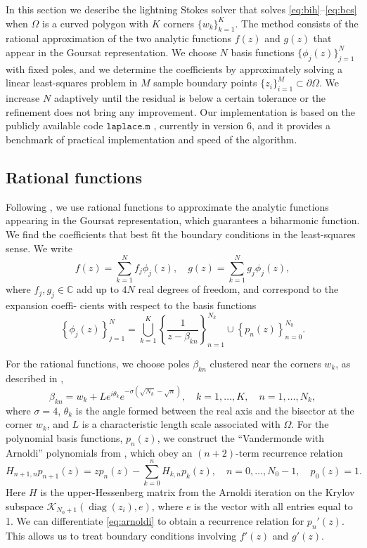 \documentclass{article}
\DeclareMathOperator{\diag}{diag}
\begin{document}
In this section we describe the lightning Stokes solver that solves
\eqref{eq:bih}--\eqref{eq:bcs} when $\Omega$ is a curved polygon with $K$
corners $\{w_k\}_{k=1}^K$. The method consists of the rational approximation of
the two analytic functions $f(z)$ and $g(z)$ that appear in the Goursat
representation. We choose $N$ basis functions $\{\phi_j(z)\}_{j=1}^N$ with
fixed poles, and we determine the coefficients by approximately solving a
linear least-squares problem in $M$ sample boundary points $\{z_i\}_{i=1}^M
\subset \partial\Omega$. We increase $N$ adaptively until the residual is below
a certain tolerance or the refinement does not bring any improvement. Our
implementation is based on the publicly available code $\texttt{laplace.m}$
\cite{tref20}, currently in version 6, and it provides a benchmark of practical
implementation and speed of the algorithm.


\subsection{Rational functions}
Following \cite{gopal19}, we use rational functions to approximate the analytic
functions appearing in the Goursat representation, which guarantees a
biharmonic function. We find the coefficients that best fit the boundary
conditions in the least-squares sense. We write
\begin{equation}
f(z) = \sum_{k=1}^N f_j \phi_j(z), \quad g(z) = \sum_{k=1}^N g_j \phi_j(z),
\end{equation}
where $f_j, g_j\in \mathbb{C}$ add up to $4N$ real degrees of freedom, and
correspond to the expansion coeffi- cients with respect to the basis functions
\begin{equation}
\left\{\phi_j(z)\right\}_{j=1}^{N} = 
   \bigcup_{k=1}^K\left\{\frac{1}{z-\beta_{kn}}\right\}_{n=1}^{N_k} 
   \cup \left\{p_n(z)\right\}_{n=0}^{N_0}.
\end{equation}

For the rational functions, we choose poles $\beta_{kn}$ clustered near the
corners $w_k$, as described in \cite{gopal19},
\begin{equation}
\beta_{kn} = w_k + Le^{i\theta_k} e^{-\sigma (\sqrt{N_k}-\sqrt{n})}, 
   \quad k=1,\ldots,K,\quad n=1,\ldots,N_k,
\end{equation}
where $\sigma=4$, $\theta_k$ is the angle formed between the real axis and the
bisector at the corner $w_k$, and $L$ is a characteristic length scale
associated with $\Omega$. For the polynomial basis functions, $p_n(z)$, we
construct the ``Vandermonde with Arnoldi'' polynomials from \cite{brubeck19},
which obey an $(n+2)$-term recurrence relation
\begin{equation} \label{eq:arnoldi}
H_{n+1,n} p_{n+1}(z) = z p_n(z) - \sum_{k=0}^n H_{k,n} p_k(z),
   \quad n=0,\ldots,N_0-1, \quad p_0(z)=1.
\end{equation}
Here $H$ is the upper-Hessenberg matrix from the Arnoldi iteration on the
Krylov subspace $\mathcal{K}_{N_0+1}(\diag(z_i), e)$, where $e$ is the vector
with all entries equal to 1. We can differentiate \eqref{eq:arnoldi} to obtain
a recurrence relation for $p_n'(z)$. This allows us to treat boundary
conditions involving $f'(z)$ and $g'(z)$.
\end{document}

